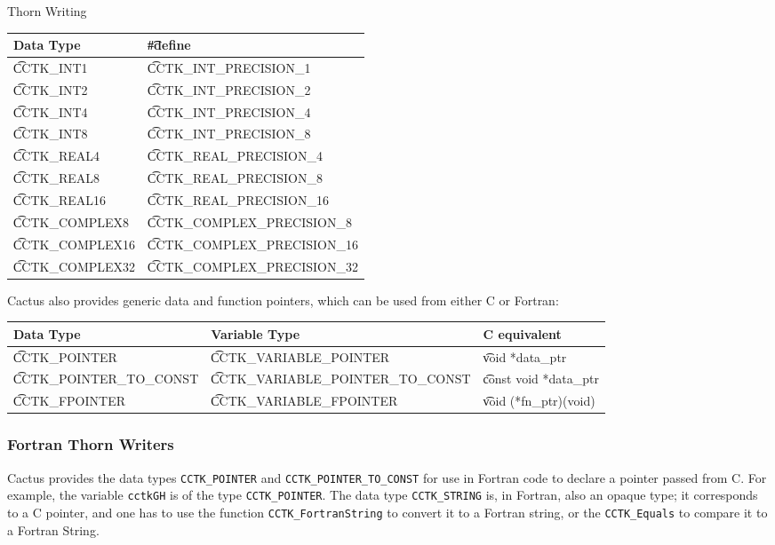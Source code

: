 \begin{cactuspart}{Thorn Writing}
\begin{center}
\begin{tabular}{|l|l|}
\hline
Data Type & {\t \#define}\\
\hline
{\t CCTK\_INT1}      & {\t CCTK\_INT\_PRECISION\_1}      \\
{\t CCTK\_INT2}      & {\t CCTK\_INT\_PRECISION\_2}      \\
{\t CCTK\_INT4}      & {\t CCTK\_INT\_PRECISION\_4}      \\
{\t CCTK\_INT8}      & {\t CCTK\_INT\_PRECISION\_8}      \\
{\t CCTK\_REAL4}     & {\t CCTK\_REAL\_PRECISION\_4}     \\
{\t CCTK\_REAL8}     & {\t CCTK\_REAL\_PRECISION\_8}     \\
{\t CCTK\_REAL16}    & {\t CCTK\_REAL\_PRECISION\_16}    \\
{\t CCTK\_COMPLEX8}  & {\t CCTK\_COMPLEX\_PRECISION\_8}  \\
{\t CCTK\_COMPLEX16} & {\t CCTK\_COMPLEX\_PRECISION\_16} \\
{\t CCTK\_COMPLEX32} & {\t CCTK\_COMPLEX\_PRECISION\_32} \\
\hline
\end{tabular}
\end{center}

Cactus also provides generic data and function pointers, which can
be used from either C or Fortran:

\begin{center}
\begin{tabular}{|l|l|l|}
\hline
   Data Type &
   Variable Type &
   C equivalent
\\\hline
   {\t CCTK\_POINTER} &
   {\t CCTK\_VARIABLE\_POINTER} &
   {\t void *data\_ptr}
\\
   {\t CCTK\_POINTER\_TO\_CONST} &
   {\t CCTK\_VARIABLE\_POINTER\_TO\_CONST} &
   {\t const void *data\_ptr}
\\
   {\t CCTK\_FPOINTER} &
   {\t CCTK\_VARIABLE\_FPOINTER} &
   {\t void (*fn\_ptr)(void)}
\\\hline
\end{tabular}
\end{center}


\subsubsection{Fortran Thorn Writers}

Cactus provides the data types \texttt{CCTK\_POINTER} and
\texttt{CCTK\_POINTER\_TO\_CONST} for use in Fortran code to declare a
pointer passed from C.  For example, the variable \texttt{cctkGH} is
of the type \texttt{CCTK\_POINTER}.  The data type
\texttt{CCTK\_STRING} is, in Fortran, also an opaque type; it corresponds
to a C pointer, and one has to use the function
\texttt{CCTK\_FortranString} to convert it to a Fortran string, or the
\texttt{CCTK\_Equals} to compare it to a Fortran String.


\end{cactuspart}
